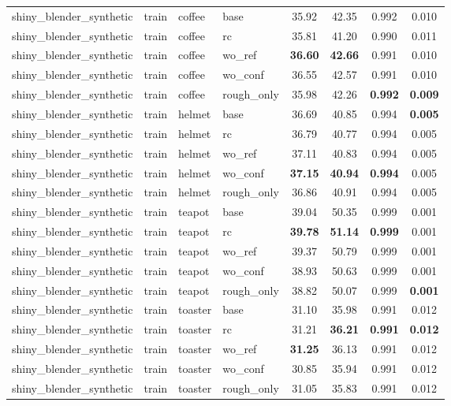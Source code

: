 \begin{table}[t]
{\begin{tabular}{llllcccc}
shiny\_blender\_synthetic & train & coffee & base & 35.92 & 42.35 & 0.992 & 0.010 \\
shiny\_blender\_synthetic & train & coffee & rc & 35.81 & 41.20 & 0.990 & 0.011 \\
shiny\_blender\_synthetic & train & coffee & wo\_ref & \textbf{36.60} & \textbf{42.66} & 0.991 & 0.010 \\
shiny\_blender\_synthetic & train & coffee & wo\_conf & 36.55 & 42.57 & 0.991 & 0.010 \\
shiny\_blender\_synthetic & train & coffee & rough\_only & 35.98 & 42.26 & \textbf{0.992} & \textbf{0.009} \\
shiny\_blender\_synthetic & train & helmet & base & 36.69 & 40.85 & 0.994 & \textbf{0.005} \\
shiny\_blender\_synthetic & train & helmet & rc & 36.79 & 40.77 & 0.994 & 0.005 \\
shiny\_blender\_synthetic & train & helmet & wo\_ref & 37.11 & 40.83 & 0.994 & 0.005 \\
shiny\_blender\_synthetic & train & helmet & wo\_conf & \textbf{37.15} & \textbf{40.94} & \textbf{0.994} & 0.005 \\
shiny\_blender\_synthetic & train & helmet & rough\_only & 36.86 & 40.91 & 0.994 & 0.005 \\
shiny\_blender\_synthetic & train & teapot & base & 39.04 & 50.35 & 0.999 & 0.001 \\
shiny\_blender\_synthetic & train & teapot & rc & \textbf{39.78} & \textbf{51.14} & \textbf{0.999} & 0.001 \\
shiny\_blender\_synthetic & train & teapot & wo\_ref & 39.37 & 50.79 & 0.999 & 0.001 \\
shiny\_blender\_synthetic & train & teapot & wo\_conf & 38.93 & 50.63 & 0.999 & 0.001 \\
shiny\_blender\_synthetic & train & teapot & rough\_only & 38.82 & 50.07 & 0.999 & \textbf{0.001} \\
shiny\_blender\_synthetic & train & toaster & base & 31.10 & 35.98 & 0.991 & 0.012 \\
shiny\_blender\_synthetic & train & toaster & rc & 31.21 & \textbf{36.21} & \textbf{0.991} & \textbf{0.012} \\
shiny\_blender\_synthetic & train & toaster & wo\_ref & \textbf{31.25} & 36.13 & 0.991 & 0.012 \\
shiny\_blender\_synthetic & train & toaster & wo\_conf & 30.85 & 35.94 & 0.991 & 0.012 \\
shiny\_blender\_synthetic & train & toaster & rough\_only & 31.05 & 35.83 & 0.991 & 0.012 \\

\end{tabular}}
\end{table}
